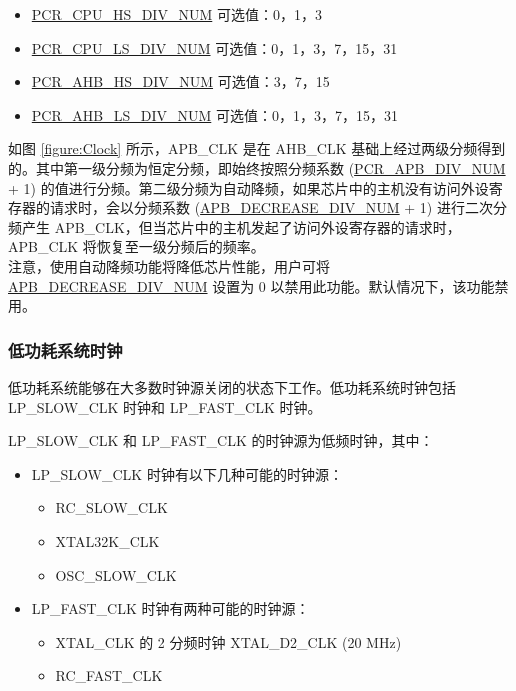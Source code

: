 \documentclass[main\_\_CN.tex]{subfiles}
\begin{document}
\begin{itemize}
    \item \hyperref[fielddesc:PCRCPUHSDIVNUM]{PCR\_CPU\_HS\_DIV\_NUM} 可选值：0，1，3
    \item \hyperref[fielddesc:PCRCPULSDIVNUM]{PCR\_CPU\_LS\_DIV\_NUM} 可选值：0，1，3，7，15，31
    \item \hyperref[fielddesc:PCRAHBHSDIVNUM]{PCR\_AHB\_HS\_DIV\_NUM} 可选值：3，7，15
    \item \hyperref[fielddesc:PCRAHBLSDIVNUM]{PCR\_AHB\_LS\_DIV\_NUM} 可选值：0，1，3，7，15，31
\end{itemize}


如图 \ref{figure:Clock} 所示，APB\_CLK 是在 AHB\_CLK 基础上经过两级分频得到的。其中第一级分频为恒定分频，即始终按照分频系数 (\hyperref[fielddesc:PCRAPBDIVNUM]{PCR\_APB\_DIV\_NUM} + 1) 的值进行分频。第二级分频为自动降频，如果芯片中的主机没有访问外设寄存器的请求时，会以分频系数 (\hyperref[fielddesc:PCRAPBDECREASEDIVNUM]{APB\_DECREASE\_DIV\_NUM} + 1) 进行二次分频产生 APB\_CLK，但当芯片中的主机发起了访问外设寄存器的请求时，APB\_CLK 将恢复至一级分频后的频率。\\
注意，使用自动降频功能将降低芯片性能，用户可将 \hyperref[fielddesc:PCRAPBDECREASEDIVNUM]{APB\_DECREASE\_DIV\_NUM} 设置为 0 以禁用此功能。默认情况下，该功能禁用。

\subsubsection{低功耗系统时钟}

低功耗系统能够在大多数时钟源关闭的状态下工作。低功耗系统时钟包括 LP\_SLOW\_CLK 时钟和 LP\_FAST\_CLK 时钟。

LP\_SLOW\_CLK 和 LP\_FAST\_CLK 的时钟源为低频时钟，其中：
\begin{itemize}
    \item LP\_SLOW\_CLK 时钟有以下几种可能的时钟源：
    \begin{itemize}
        \item RC\_SLOW\_CLK
        \item XTAL32K\_CLK
        \item OSC\_SLOW\_CLK
    \end{itemize}
    \item LP\_FAST\_CLK 时钟有两种可能的时钟源：
    \begin{itemize}
        \item XTAL\_CLK 的 2 分频时钟 XTAL\_D2\_CLK (20 MHz)
        \item RC\_FAST\_CLK
    \end{itemize}
\end{itemize}
\end{document}
